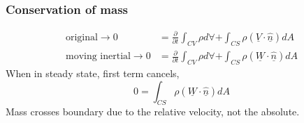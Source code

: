 \subsubsection{Conservation of mass}
\begin{align}
  \textrm{original} \rightarrow 0        & = \frac{\partial}{\partial t} \int_{CV} \rho d \forall + \int_{CS} \rho (\underline{V}\cdot \underline{\hat{n}}) dA \\
  \textrm{moving inertial} \rightarrow 0 & = \frac{\partial}{\partial t} \int_{CV} \rho d \forall + \int_{CS} \rho (\underline{W}\cdot \underline{\hat{n}}) dA
\end{align}
When in steady state, first term cancels,
\begin{equation}
  0 = \int_{CS} \rho (\underline{W}\cdot \underline{\hat{n}}) dA
\end{equation}
Mass crosses boundary due to the relative velocity, not the absolute.
